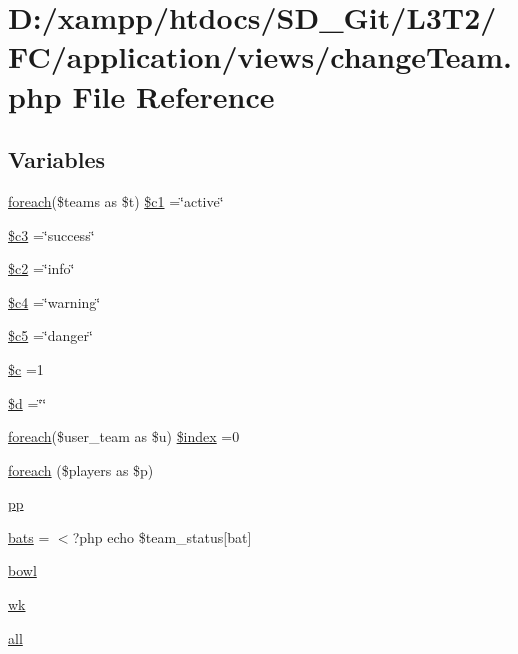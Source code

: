 \hypertarget{change_team_8php}{}\section{D\+:/xampp/htdocs/\+S\+D\+\_\+\+Git/\+L3\+T2/\+F\+C/application/views/change\+Team.php File Reference}
\label{change_team_8php}
\subsection*{Variables}
\begin{DoxyCompactItemize}
\item 
\hyperlink{view__points_8php_a7ad0caecb10918b48851bd7908ec97c5}{foreach}(\$teams as \$t) \hyperlink{change_team_8php_a3c2eef6861cb08d552c4e5285fce2913}{\$c1} =\char`\"{}active\char`\"{}
\item 
\hyperlink{change_team_8php_a78a28e488f33dbd56e562b07dc3862e3}{\$c3} =\char`\"{}success\char`\"{}
\item 
\hyperlink{change_team_8php_a7d0ce9eb4b126a1a12c7dade4f7ab7ef}{\$c2} =\char`\"{}info\char`\"{}
\item 
\hyperlink{change_team_8php_a480a6698b6eb8bfee885295be554a1e7}{\$c4} =\char`\"{}warning\char`\"{}
\item 
\hyperlink{change_team_8php_ad07a0ce016744e189c6f98b13c96812c}{\$c5} =\char`\"{}danger\char`\"{}
\item 
\hyperlink{change_team_8php_ab73d7f4f2dae233dd561e7fdaab3a77b}{\$c} =1
\item 
\hyperlink{change_team_8php_a0cf5dd496d9f5ff1edf00d234771dcfe}{\$d} =\char`\"{}\char`\"{}
\item 
\hyperlink{view__points_8php_a7ad0caecb10918b48851bd7908ec97c5}{foreach}(\$user\+\_\+team as \$u) \hyperlink{change_team_8php_af7d009a3f55ba9aa079cbea24e43d8ce}{\$index} =0
\item 
\hyperlink{change_team_8php_adeedc747f289831747aab8fb71df7bd3}{foreach} (\$players as \$p)
\item 
\hyperlink{change_team_8php_a2d7acadf10224ffdabeab505970a8934}{pp}
\item 
\hyperlink{change_team_8php_ac318f5f7c632b56b8864a99c05c8fe6f}{bats} = $<$?php echo \$team\+\_\+status\mbox{[}\textquotesingle{}bat\textquotesingle{}\mbox{]}
\item 
\hyperlink{change_team_8php_a3b1858d465baedbd7bc50126c5f7b805}{bowl}
\item 
\hyperlink{change_team_8php_a0bef1939b3c02eea4b89f1a8247419cf}{wk}
\item 
\hyperlink{change_team_8php_a5f3fcf87333f5770d16608f67ad88d19}{all}
\end{DoxyCompactItemize}


